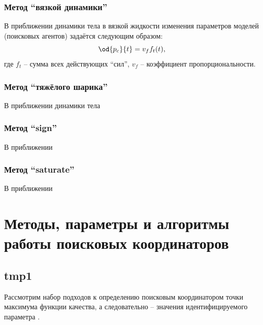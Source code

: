 


\subsubsection{Метод ``вязкой динамики''}  %


В приближении динамики тела в вязкой жидкости
изменения параметров моделей (поисковых агентов) задаётся следующим образом:
%
\begin{equation}
  \od{p_c}{t} = v_f f_t(t),
  \label{atu:eq:dp_dt}
\end{equation}
%
\noindent
где $f_t$ -- сумма всех действующих ``сил'', $v_f$ -- коэффициент
пропорциональности.

\subsubsection{Метод ``тяжёлого шарика''}  %

В приближении динамики тела 



\subsubsection{Метод ``sign''}  %

В приближении


\subsubsection{Метод ``saturate''}  %

В приближении










\section{Методы, параметры и алгоритмы работы поисковых координаторов}  %

\subsection{tmp1} %


Рассмотрим набор подходов к определению поисковым координатором
точки максимума функции качества, а следовательно -- значения идентифицируемого параметра \cite{atu_st99,atu_jacs2015}.

